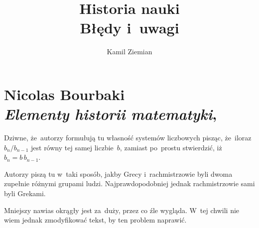 \documentclass[a4paper,11pt]{article}
\title{Historia nauki \\
  {\Large Błędy i~uwagi}}
\author{Kamil Ziemian}
\numberwithin{equation}{section}
\begin{document}



\maketitle %



\section{ %
  Nicolas Bourbaki \\
  \textit{Elementy historii matematyki},
  \cite{BourbakiElementyHistoriiMatematyki1980}}

\vspace{0em}



\vspace{0em}


\noindent
{} Dziwne, że~autorzy formułują tu własność systemów
liczbowych pisząc, że~iloraz $b_{ n } / b_{ n - 1 }$ jest równy tej
samej liczbie~$b$, zamiast po~prostu stwierdzić,
iż~$b_{ n } = b \, b_{ n - 1 }$.

\VerSpaceFour





\noindent
{} Autorzy piszą tu w~taki sposób, jakby Grecy
i~rachmistrzowie byli dwoma zupełnie różnymi grupami ludzi.
Najprawdopodobniej jednak rachmistrzowie sami byli Grekami.

\VerSpaceFour





\noindent
{} Mniejszy nawias okrągły jest za~duży, przez co źle
wygląda. W~tej chwili nie wiem jednak zmodyfikować tekst, by ten problem
naprawić.





\newpage

\end{document}
